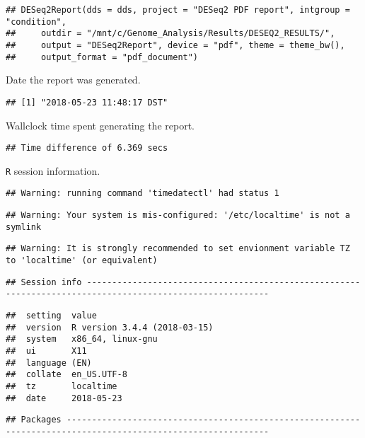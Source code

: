 \documentclass[]{article}
\begin{document}
\begin{verbatim}
## DESeq2Report(dds = dds, project = "DESeq2 PDF report", intgroup = "condition", 
##     outdir = "/mnt/c/Genome_Analysis/Results/DESEQ2_RESULTS/", 
##     output = "DESeq2Report", device = "pdf", theme = theme_bw(), 
##     output_format = "pdf_document")
\end{verbatim}

Date the report was generated.

\begin{verbatim}
## [1] "2018-05-23 11:48:17 DST"
\end{verbatim}

Wallclock time spent generating the report.

\begin{verbatim}
## Time difference of 6.369 secs
\end{verbatim}

\texttt{R} session information.

\begin{verbatim}
## Warning: running command 'timedatectl' had status 1
\end{verbatim}

\begin{verbatim}
## Warning: Your system is mis-configured: '/etc/localtime' is not a symlink
\end{verbatim}

\begin{verbatim}
## Warning: It is strongly recommended to set envionment variable TZ to 'localtime' (or equivalent)
\end{verbatim}

\begin{verbatim}
## Session info ----------------------------------------------------------------------------------------------------------
\end{verbatim}

\begin{verbatim}
##  setting  value                       
##  version  R version 3.4.4 (2018-03-15)
##  system   x86_64, linux-gnu           
##  ui       X11                         
##  language (EN)                        
##  collate  en_US.UTF-8                 
##  tz       localtime                   
##  date     2018-05-23
\end{verbatim}

\begin{verbatim}
## Packages --------------------------------------------------------------------------------------------------------------
\end{verbatim}
\end{document}
